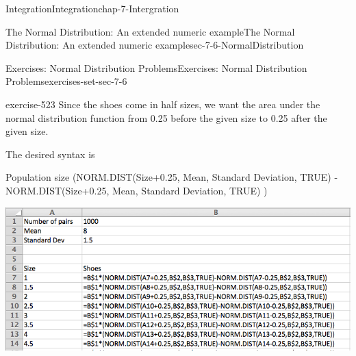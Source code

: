 \documentclass[oneside,10pt,]{book}
\numberwithin{equation}{section}
\begin{document}
\begin{chapterptx}{Integration}{}{Integration}{}{}{chap-7-Intergration}
\begin{sectionptx}{The Normal Distribution: An extended numeric example}{}{The Normal Distribution: An extended numeric example}{}{}{sec-7-6-NormalDistribution}
\begin{exercises-subsection-numberless}{Exercises: Normal Distribution Problems}{}{Exercises: Normal Distribution Problems}{}{}{exercises-set-sec-7-6}
\begin{divisionexercise}{7}{}{}{exercise-523}
Since the shoes come in half sizes, we want the area under the normal distribution function from 0.25 before the given size to 0.25 after the given size.%
\par
\hypertarget{p-2987}{}%
The desired syntax is%
\par
\hypertarget{p-2988}{}%
Population size \textasteriskcentered{} (NORM.DIST(Size+0.25, Mean, Standard Deviation, TRUE) - NORM.DIST(Size+0.25, Mean, Standard Deviation, TRUE) )%
\begin{sidebyside}{1}{0.1}{0.1}{0}%
\begin{sbspanel}{0.8}%
\includegraphics[width=1\linewidth]{images/sec7-6-sol7a.png}
\end{sbspanel}%
\end{sidebyside}%
\begin{sidebyside}{1}{0.3}{0.3}{0}%
\begin{sbspanel}{0.4}%

\end{sbspanel}
\end{sidebyside}
\end{divisionexercise}
\end{exercises-subsection-numberless}
\end{sectionptx}
\end{chapterptx}
\end{document}
